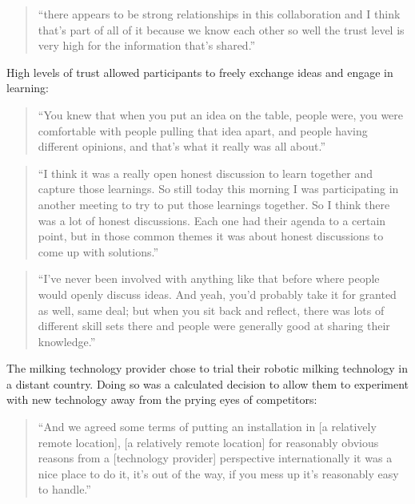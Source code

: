 \begin{quote}
\small
\enquote{there appears to be strong relationships in this collaboration and I think that's part of all of it because we know each other so well the trust level is very high for the information that's shared.} \\
\end{quote}

High levels of trust allowed participants to freely exchange ideas and engage in learning: 

\begin{quote}
\small
\enquote{You knew that when you put an idea on the table, people were, you were comfortable with people pulling that idea apart, and people having different opinions, and that’s what it really was all about.} \\
\end{quote}

\begin{quote}
\small
\enquote{I think it was a really open honest discussion to learn together and capture those learnings. So still today this morning I was participating in another meeting to try to put those learnings together. So I think there was a lot of honest discussions. Each one had their agenda to a certain point, but in those common themes it was about honest discussions to come up with solutions.} \\
\end{quote}

\begin{quote}
\small
\enquote{I've never been involved with anything like that before where people would openly discuss ideas. And yeah, you'd probably take it for granted as well, same deal; but when you sit back and reflect, there was lots of different skill sets there and people were generally good at sharing their knowledge.} \\
\end{quote}

The milking technology provider chose to trial their robotic milking technology in a distant country. Doing so was a calculated decision to allow them to experiment with new technology away from the prying eyes of competitors:

\begin{quote}
\small
\enquote{And we agreed some terms of putting an installation in [a relatively remote location], [a relatively remote location] for reasonably obvious reasons from a [technology provider] perspective internationally it was a nice place to do it, it's out of the way, if you mess up it's reasonably easy to handle.} \\
\end{quote}

